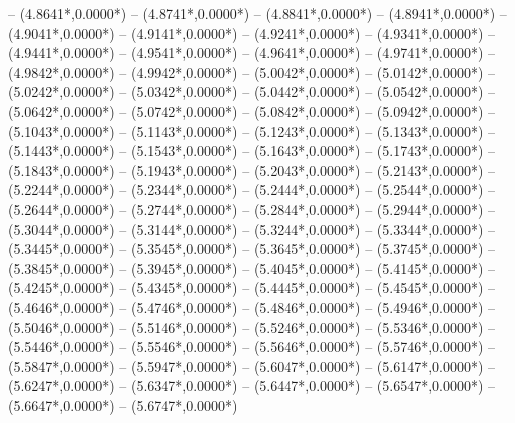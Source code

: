 {	-- ({4.8641*\dx},{0.0000*\dy})
	-- ({4.8741*\dx},{0.0000*\dy})
	-- ({4.8841*\dx},{0.0000*\dy})
	-- ({4.8941*\dx},{0.0000*\dy})
	-- ({4.9041*\dx},{0.0000*\dy})
	-- ({4.9141*\dx},{0.0000*\dy})
	-- ({4.9241*\dx},{0.0000*\dy})
	-- ({4.9341*\dx},{0.0000*\dy})
	-- ({4.9441*\dx},{0.0000*\dy})
	-- ({4.9541*\dx},{0.0000*\dy})
	-- ({4.9641*\dx},{0.0000*\dy})
	-- ({4.9741*\dx},{0.0000*\dy})
	-- ({4.9842*\dx},{0.0000*\dy})
	-- ({4.9942*\dx},{0.0000*\dy})
	-- ({5.0042*\dx},{0.0000*\dy})
	-- ({5.0142*\dx},{0.0000*\dy})
	-- ({5.0242*\dx},{0.0000*\dy})
	-- ({5.0342*\dx},{0.0000*\dy})
	-- ({5.0442*\dx},{0.0000*\dy})
	-- ({5.0542*\dx},{0.0000*\dy})
	-- ({5.0642*\dx},{0.0000*\dy})
	-- ({5.0742*\dx},{0.0000*\dy})
	-- ({5.0842*\dx},{0.0000*\dy})
	-- ({5.0942*\dx},{0.0000*\dy})
	-- ({5.1043*\dx},{0.0000*\dy})
	-- ({5.1143*\dx},{0.0000*\dy})
	-- ({5.1243*\dx},{0.0000*\dy})
	-- ({5.1343*\dx},{0.0000*\dy})
	-- ({5.1443*\dx},{0.0000*\dy})
	-- ({5.1543*\dx},{0.0000*\dy})
	-- ({5.1643*\dx},{0.0000*\dy})
	-- ({5.1743*\dx},{0.0000*\dy})
	-- ({5.1843*\dx},{0.0000*\dy})
	-- ({5.1943*\dx},{0.0000*\dy})
	-- ({5.2043*\dx},{0.0000*\dy})
	-- ({5.2143*\dx},{0.0000*\dy})
	-- ({5.2244*\dx},{0.0000*\dy})
	-- ({5.2344*\dx},{0.0000*\dy})
	-- ({5.2444*\dx},{0.0000*\dy})
	-- ({5.2544*\dx},{0.0000*\dy})
	-- ({5.2644*\dx},{0.0000*\dy})
	-- ({5.2744*\dx},{0.0000*\dy})
	-- ({5.2844*\dx},{0.0000*\dy})
	-- ({5.2944*\dx},{0.0000*\dy})
	-- ({5.3044*\dx},{0.0000*\dy})
	-- ({5.3144*\dx},{0.0000*\dy})
	-- ({5.3244*\dx},{0.0000*\dy})
	-- ({5.3344*\dx},{0.0000*\dy})
	-- ({5.3445*\dx},{0.0000*\dy})
	-- ({5.3545*\dx},{0.0000*\dy})
	-- ({5.3645*\dx},{0.0000*\dy})
	-- ({5.3745*\dx},{0.0000*\dy})
	-- ({5.3845*\dx},{0.0000*\dy})
	-- ({5.3945*\dx},{0.0000*\dy})
	-- ({5.4045*\dx},{0.0000*\dy})
	-- ({5.4145*\dx},{0.0000*\dy})
	-- ({5.4245*\dx},{0.0000*\dy})
	-- ({5.4345*\dx},{0.0000*\dy})
	-- ({5.4445*\dx},{0.0000*\dy})
	-- ({5.4545*\dx},{0.0000*\dy})
	-- ({5.4646*\dx},{0.0000*\dy})
	-- ({5.4746*\dx},{0.0000*\dy})
	-- ({5.4846*\dx},{0.0000*\dy})
	-- ({5.4946*\dx},{0.0000*\dy})
	-- ({5.5046*\dx},{0.0000*\dy})
	-- ({5.5146*\dx},{0.0000*\dy})
	-- ({5.5246*\dx},{0.0000*\dy})
	-- ({5.5346*\dx},{0.0000*\dy})
	-- ({5.5446*\dx},{0.0000*\dy})
	-- ({5.5546*\dx},{0.0000*\dy})
	-- ({5.5646*\dx},{0.0000*\dy})
	-- ({5.5746*\dx},{0.0000*\dy})
	-- ({5.5847*\dx},{0.0000*\dy})
	-- ({5.5947*\dx},{0.0000*\dy})
	-- ({5.6047*\dx},{0.0000*\dy})
	-- ({5.6147*\dx},{0.0000*\dy})
	-- ({5.6247*\dx},{0.0000*\dy})
	-- ({5.6347*\dx},{0.0000*\dy})
	-- ({5.6447*\dx},{0.0000*\dy})
	-- ({5.6547*\dx},{0.0000*\dy})
	-- ({5.6647*\dx},{0.0000*\dy})
	-- ({5.6747*\dx},{0.0000*\dy})
}
